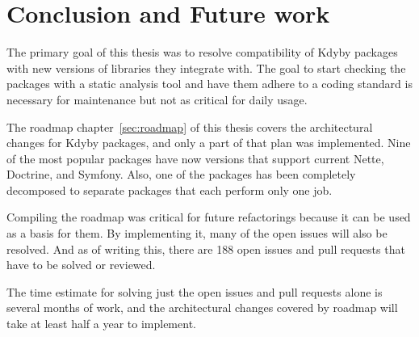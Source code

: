 \chapter{Conclusion and Future work}

The primary goal of this thesis was to resolve compatibility of Kdyby packages with new versions of libraries they integrate with. The goal to start checking the packages with a static analysis tool and have them adhere to a coding standard is necessary for maintenance but not as critical for daily usage.

The roadmap chapter~\ref{sec:roadmap} of this thesis covers the architectural changes for Kdyby packages, and only a part of that plan was implemented. Nine of the most popular packages have now versions that support current Nette, Doctrine, and Symfony. Also, one of the packages has been completely decomposed to separate packages that each perform only one job.

Compiling the roadmap was critical for future refactorings because it can be used as a basis for them. By implementing it, many of the open issues will also be resolved. And as of writing this, there are 188 open issues and pull requests that have to be solved or reviewed.

The time estimate for solving just the open issues and pull requests alone is several months of work, and the architectural changes covered by roadmap will take at least half a year to implement.
